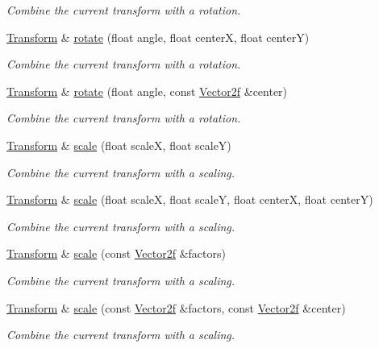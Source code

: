 \begin{DoxyCompactItemize}
\begin{DoxyCompactList}\small\item\em Combine the current transform with a rotation. \end{DoxyCompactList}\item 
\hyperlink{classsf_1_1_transform}{Transform} \& \hyperlink{classsf_1_1_transform_af0b7cc3fed36d0fa22d5d331a779eee2}{rotate} (float angle, float centerX, float centerY)
\begin{DoxyCompactList}\small\item\em Combine the current transform with a rotation. \end{DoxyCompactList}\item 
\hyperlink{classsf_1_1_transform}{Transform} \& \hyperlink{classsf_1_1_transform_ad2a2520ad81724079d109d4a986f9902}{rotate} (float angle, const \hyperlink{classsf_1_1_vector2}{Vector2f} \&center)
\begin{DoxyCompactList}\small\item\em Combine the current transform with a rotation. \end{DoxyCompactList}\item 
\hyperlink{classsf_1_1_transform}{Transform} \& \hyperlink{classsf_1_1_transform_a3f46af807f69d74120fb836334268671}{scale} (float scaleX, float scaleY)
\begin{DoxyCompactList}\small\item\em Combine the current transform with a scaling. \end{DoxyCompactList}\item 
\hyperlink{classsf_1_1_transform}{Transform} \& \hyperlink{classsf_1_1_transform_a6eaeedd35e289cb17f9bf7f24dc28daa}{scale} (float scaleX, float scaleY, float centerX, float centerY)
\begin{DoxyCompactList}\small\item\em Combine the current transform with a scaling. \end{DoxyCompactList}\item 
\hyperlink{classsf_1_1_transform}{Transform} \& \hyperlink{classsf_1_1_transform_a3d57622a7ab309925c9d9887c99cc720}{scale} (const \hyperlink{classsf_1_1_vector2}{Vector2f} \&factors)
\begin{DoxyCompactList}\small\item\em Combine the current transform with a scaling. \end{DoxyCompactList}\item 
\hyperlink{classsf_1_1_transform}{Transform} \& \hyperlink{classsf_1_1_transform_a9198da375173127901f3095e0165ee1b}{scale} (const \hyperlink{classsf_1_1_vector2}{Vector2f} \&factors, const \hyperlink{classsf_1_1_vector2}{Vector2f} \&center)
\begin{DoxyCompactList}\small\item\em Combine the current transform with a scaling. \end{DoxyCompactList}\end{DoxyCompactItemize}
